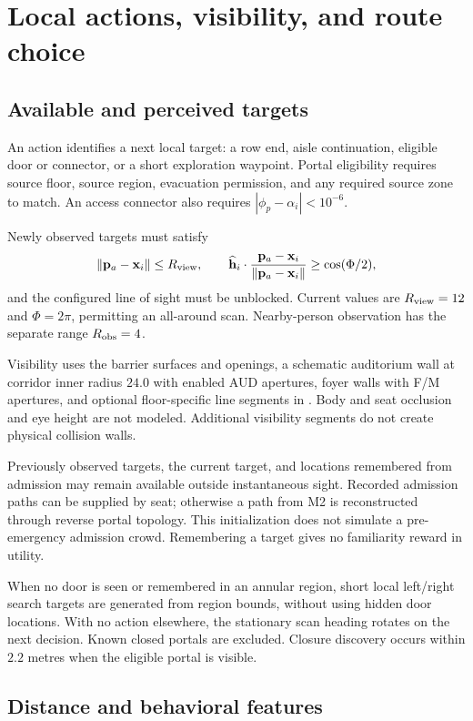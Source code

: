 \documentclass[11pt]{article}
\newcommand{\code}[1]{\texttt{\detokenize{#1}}}
\begin{document}
\section{Local actions, visibility, and route choice}

\subsection{Available and perceived targets}

An action identifies a next local target: a row end, aisle continuation,
eligible door or connector, or a short exploration waypoint. Portal
eligibility requires source floor, source region, evacuation permission,
and any required source zone to match. An access connector also requires
$|\phi_p-\alpha_i|<10^{-6}$.

Newly observed targets must satisfy
\[
 \|\mathbf p_a-\mathbf x_i\|\leq R_{\rm view},\qquad
 \widehat{\mathbf h}_i\cdot
 \frac{\mathbf p_a-\mathbf x_i}{\|\mathbf p_a-\mathbf x_i\|}
 \geq\cos(\Phi/2),
\]
and the configured line of sight must be unblocked. Current values are
$R_{\rm view}=12$ and $\Phi=2\pi$, permitting an all-around scan.
Nearby-person observation has the separate range $R_{\rm obs}=4$.

Visibility uses the barrier surfaces and openings, a schematic auditorium
wall at corridor inner radius $24.0$ with enabled AUD apertures, foyer walls
with F/M apertures, and optional floor-specific line segments in
\code{visibilityWalls}. Body and seat occlusion and eye height are not modeled.
Additional visibility segments do not create physical collision walls.

Previously observed targets, the current target, and locations remembered
from admission may remain available outside instantaneous sight. Recorded
admission paths can be supplied by seat; otherwise a path from M2 is
reconstructed through reverse portal topology. This initialization does not
simulate a pre-emergency admission crowd. Remembering a target gives no
familiarity reward in utility.

When no door is seen or remembered in an annular region, short local left/right
search targets are generated from region bounds, without using hidden door
locations. With no action elsewhere, the stationary scan heading rotates on
the next decision. Known closed portals are excluded. Closure discovery occurs
within $2.2$ metres when the eligible portal is visible.

\subsection{Distance and behavioral features}
\end{document}
